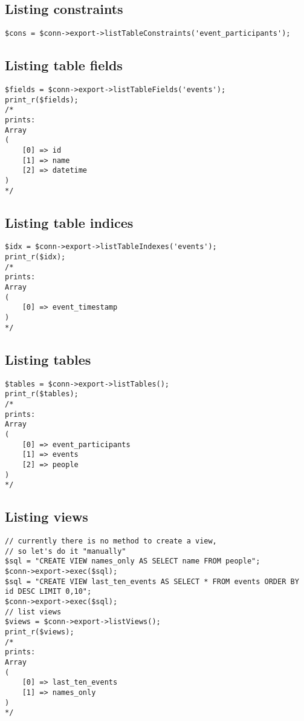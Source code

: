 \documentclass[11pt,a4paper]{report}
\begin{document}
\subsection{Listing constraints}
\begin{verbatim}
$cons = $conn->export->listTableConstraints('event_participants');
\end{verbatim}

\subsection{Listing table fields}
\begin{verbatim}
$fields = $conn->export->listTableFields('events');
print_r($fields);
/*
prints:
Array
(
    [0] => id
    [1] => name
    [2] => datetime
)
*/
\end{verbatim}

\subsection{Listing table indices}
\begin{verbatim}
$idx = $conn->export->listTableIndexes('events');
print_r($idx);
/*
prints:
Array
(
    [0] => event_timestamp
)
*/
\end{verbatim}

\subsection{Listing tables}
\begin{verbatim}
$tables = $conn->export->listTables();
print_r($tables);
/*
prints:
Array
(
    [0] => event_participants
    [1] => events
    [2] => people
)
*/
\end{verbatim}

\subsection{Listing views}
\begin{verbatim}
// currently there is no method to create a view,
// so let's do it "manually"
$sql = "CREATE VIEW names_only AS SELECT name FROM people";
$conn->export->exec($sql);
$sql = "CREATE VIEW last_ten_events AS SELECT * FROM events ORDER BY id DESC LIMIT 0,10";
$conn->export->exec($sql);
// list views
$views = $conn->export->listViews();
print_r($views);
/*
prints:
Array
(
    [0] => last_ten_events
    [1] => names_only
)
*/
\end{verbatim}
\end{document}
